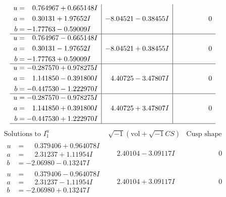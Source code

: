 \documentclass[1p]{elsarticle_modified}
\theoremstyle{definition}
\newcommand{\I}{\sqrt{-1}}
\begin{document}
$$\begin{array}{c|c|c}
\begin{aligned}
u &= \phantom{-}0.764967 + 0.665148 I \\
a &= \phantom{-}0.30131 + 1.97652 I \\
b &= -1.77763 - 0.59009 I\end{aligned}
 & -8.04521 - 0.38455 I & \phantom{-0.000000 } 0 \\ \hline\begin{aligned}
u &= \phantom{-}0.764967 - 0.665148 I \\
a &= \phantom{-}0.30131 - 1.97652 I \\
b &= -1.77763 + 0.59009 I\end{aligned}
 & -8.04521 + 0.38455 I & \phantom{-0.000000 } 0 \\ \hline\begin{aligned}
u &= -0.287570 + 0.978275 I \\
a &= \phantom{-}1.141850 - 0.391800 I \\
b &= -0.447530 - 1.222970 I\end{aligned}
 & \phantom{-}4.40725 - 3.47807 I & \phantom{-0.000000 } 0 \\ \hline\begin{aligned}
u &= -0.287570 - 0.978275 I \\
a &= \phantom{-}1.141850 + 0.391800 I \\
b &= -0.447530 + 1.222970 I\end{aligned}
 & \phantom{-}4.40725 + 3.47807 I & \phantom{-0.000000 } 0\\
 \hline 
 \end{array}$$\newpage$$\begin{array}{c|c|c}  
\text{Solutions to }I^u_{1}& \I (\text{vol} + \sqrt{-1}CS) & \text{Cusp shape}\\
 \hline 
\begin{aligned}
u &= \phantom{-}0.379406 + 0.964078 I \\
a &= \phantom{-}2.31237 + 1.11954 I \\
b &= -2.06980 - 0.13247 I\end{aligned}
 & \phantom{-}2.40104 - 3.09117 I & \phantom{-0.000000 } 0 \\ \hline\begin{aligned}
u &= \phantom{-}0.379406 - 0.964078 I \\
a &= \phantom{-}2.31237 - 1.11954 I \\
b &= -2.06980 + 0.13247 I\end{aligned}
 & \phantom{-}2.40104 + 3.09117 I & \phantom{-0.000000 } 0 \\ \hline\begin{aligned}

\end{aligned}
\end{array}$$
\end{document}
